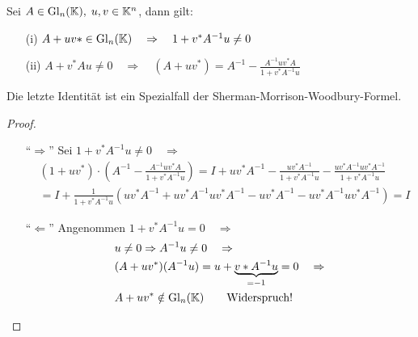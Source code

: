 \begin{Lemma}
Sei $A \in \mathrm{Gl}_n(\mathbb K), \; u, v \in \mathbb K^n$, dann gilt:
  \begin{enumerate}
    \item[(i)] $A + u  v* \in \mathrm{Gl}_n(\mathbb K) \quad \Rightarrow \quad 1 + v^* A^{-1} u \ne 0$
    \item[(ii)] $A + v^* A u \ne 0  \quad \Rightarrow \quad
      (A + uv^*) = A^{-1} - \frac{A^{-1} u v^* A}{1 + v^*A^{-1}u}$
  \end{enumerate}
Die letzte Identität ist ein Spezialfall der Sherman-Morrison-Woodbury-Formel.
\end{Lemma}
\begin{proof}
\quad \\
  \begin{enumerate}
    \item["`$\Rightarrow$"'] Sei $1 + v^* A^{-1} u \ne 0 \quad \Rightarrow $
    \begin{align*}
    & (1 + u v^*)\cdot \left(A^{-1} - \frac{A^{-1} u v^* A}{1 + v^*A^{-1}u}  \right) =
    I + u v^*A^{-1} - \frac{u v^* A^{-1}}{1 + v^*A^{-1} u} -
       \frac{u v^* A^{-1}u v^* A^{-1}}{1 +  v^*A^{-1} u} \\
    & = I + \frac{1}{1 + v^*A^{-1}u} \left( u v^* A^{-1} + u v^* A^{-1} u v^* A^{-1} -
      u v^* A^{-1} - u v^* A^{-1} u v^* A^{-1} \right) = I
    \end{align*}

    \item["`$\Leftarrow$"'] Angenommen $1 + v^* A^{-1} u = 0 \quad \Rightarrow $
    \begin{align*}
      & u \ne 0 \Rightarrow A^{-1} u \ne 0 \quad \Rightarrow \\
      & (A + u v^*) (A^{-1} u) = u + \underbrace{v* A^{-1} u}_{= -1} = 0 \quad \Rightarrow \\
     &  A + u v^* \notin \mathrm{Gl}_n(\mathbb K) \qquad \text{Widerspruch!}
    \end{align*}
  \end{enumerate}
\end{proof}
